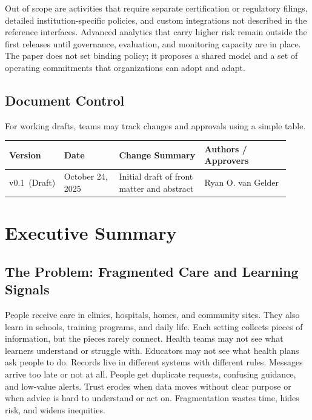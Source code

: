 \documentclass[12pt]{article}
\newcommand{\paperversion}{v0.1 \,(Draft)}
\newcommand{\paperdate}{October 24, 2025}
\newcommand{\paperauthors}{Ryan O. van Gelder}
\begin{document}
Out of scope are activities that require separate certification or regulatory filings, detailed institution-specific policies, and custom integrations not described in the reference interfaces. Advanced analytics that carry higher risk remain outside the first releases until governance, evaluation, and monitoring capacity are in place. The paper does not set binding policy; it proposes a shared model and a set of operating commitments that organizations can adopt and adapt.

\subsection*{Document Control}
For working drafts, teams may track changes and approvals using a simple table.

\begin{longtable}{@{}p{0.18\linewidth}p{0.18\linewidth}p{0.28\linewidth}p{0.28\linewidth}@{}}
\toprule
\textbf{Version} & \textbf{Date} & \textbf{Change Summary} & \textbf{Authors / Approvers} \\
\midrule
\endhead
\paperversion & \paperdate & Initial draft of front matter and abstract & \paperauthors \\
\bottomrule
\end{longtable}

\newpage
\section{Executive Summary}

\subsection*{The Problem: Fragmented Care and Learning Signals}
People receive care in clinics, hospitals, homes, and community sites. They also learn in schools, training programs, and daily life. Each setting collects pieces of information, but the pieces rarely connect. Health teams may not see what learners understand or struggle with. Educators may not see what health plans ask people to do. Records live in different systems with different rules. Messages arrive too late or not at all. People get duplicate requests, confusing guidance, and low-value alerts. Trust erodes when data moves without clear purpose or when advice is hard to understand or act on. Fragmentation wastes time, hides risk, and widens inequities.
\end{document}
